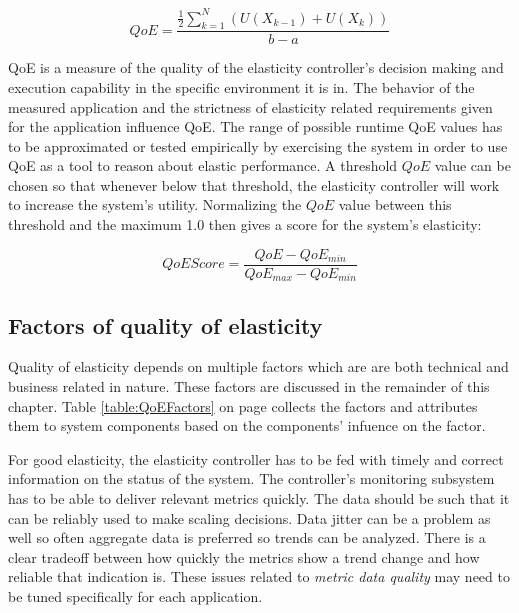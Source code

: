 \documentclass[english]{tktltiki2}
\theoremstyle{definition}
\theoremstyle{remark}
\begin{document}
\begin{equation}
QoE = \frac{\frac{1}{2}\sum\limits_{k=1}^N (U(X_{k-1}) + U(X_{k}))}{b-a} 
\label{eq:qoefunctionnumericalfinal}
\end{equation}

QoE is a measure of the quality of the elasticity controller's decision making
and execution capability in the specific environment it is in. The behavior of
the measured application and the strictness of elasticity related requirements
given for the application influence QoE. The range of possible runtime QoE
values has to be approximated or tested empirically by exercising the system in
order to use QoE as a tool to reason about elastic performance. A threshold
$QoE$ value can be chosen so that whenever below that threshold, the elasticity
controller will work to increase the system's utility. Normalizing the $QoE$
value between this threshold and the maximum 1.0 then gives a score for the
system's elasticity:

\begin{equation}
	QoEScore = \frac{QoE - QoE_{min}}{QoE_{max} - QoE_{min}} 
	\label{eq:qoeScore}
\end{equation}


\subsection{Factors of quality of elasticity}

Quality of elasticity depends on multiple factors which are are both technical
and business related in nature. These factors are discussed in the remainder
of this chapter. Table \ref{table:QoEFactors} on page
\pageref{table:QoEFactors} collects the factors and attributes them to system
components based on the components' infuence on the factor.

For good elasticity, the elasticity controller has to be fed with timely and
correct information on the status of the system. The controller's monitoring
subsystem has to be able to deliver relevant metrics quickly. The data should be
such that it can be reliably used to make scaling decisions. Data jitter can be
a problem as well so often aggregate data is preferred so trends can be
analyzed. There is a clear tradeoff between how quickly the metrics show a trend
change and how reliable that indication is. These issues related to
\textit{metric data quality} may need to be tuned specifically for each
application.
\end{document}
